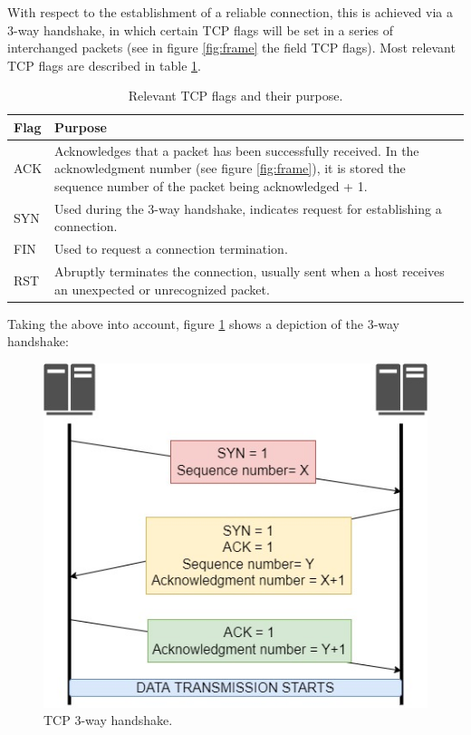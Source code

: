 \documentclass[12pt]{report} %
\begin{document}
With respect to the establishment of a reliable connection, this is achieved via a 3-way handshake, in which certain TCP flags will be set in a series of interchanged packets (see in figure \ref{fig:frame} the field TCP flags). Most relevant TCP flags are described in table \ref{table:tcp_flags}.

\begin{table}[H]
\begin{tabular}{|>{\centering\arraybackslash}p{4cm}|>{\centering\arraybackslash}p{10cm}|}
\hline
Flag & Purpose\\
\hline
\hline
ACK & Acknowledges that a packet has been successfully received. In the acknowledgment number (see figure \ref{fig:frame}), it is stored the sequence number of the packet being acknowledged + 1. \\
\hline
SYN & Used during the 3-way handshake, indicates request for establishing a connection.\\
\hline
FIN & Used to request a connection termination.\\
\hline
RST & Abruptly terminates the connection, usually sent when a host receives an unexpected or unrecognized packet.\\
\hline
\end{tabular}
\caption{Relevant TCP flags and their purpose.}
\label{table:tcp_flags}
\end{table}

Taking the above into account, figure \ref{fig:tcp_conn} shows a depiction of the 3-way handshake\cite{tcp_handshake}:
\begin{figure}[H]
	\centering
	\includegraphics[width=12cm]{tcp_conn.jpg}
	\caption{TCP 3-way handshake.}
	\label{fig:tcp_conn}
\end{figure}
\end{document}
